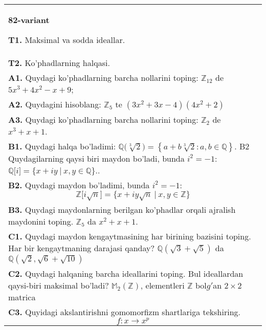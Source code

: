 \documentclass{article}
\begin{document}
\begin{tabular}{m{17cm}}
\textbf{82-variant}
\newline

\textbf{T1.} Maksimal va sodda ideallar. \\
\textbf{T2.} Ko'phadlarning halqasi. \\
\textbf{A1.} Quydagi ko'phadlarning barcha nollarini toping:
\(\mathbb{Z}_{12}\) de \(5x^{3} + 4x^{2} - x + 9\); \\
\textbf{A2.} Quydagini hisoblang:
\(\mathbb{Z}_{5}\) te \(\left( 3x^{2} + 3x - 4 \right)\left( 4x^{2} + 2 \right)\) \\
\textbf{A3.} Quydagi ko'phadlarning barcha nollarini toping:
\(\mathbb{Z}_{2}\) de \(x^{3} + x + 1\). \\
\textbf{B1.} Quydagi halqa bo'ladimi:
\(\mathbb{Q(}\sqrt[3]{2}) = \left\{ a + b\sqrt[3]{2}:a,b \in \mathbb{Q} \right\}\).
B2 Quydagilarning qaysi biri maydon bo'ladi, bunda \(i^{2} = - 1\):
\(\mathbb{Q\lbrack}i\rbrack = \{ x + iy\ |\ x,y \in \mathbb{Q\}}\).. \\
\textbf{B2.} Quydagi maydon bo'ladimi, bunda \(i^{2} = - 1\):
\[\mathbb{Z\lbrack}i\sqrt{n}\rbrack = \{ x + iy\sqrt{n}\ |\ x,y \in \mathbb{Z\}}\] \\
\textbf{B3.} Quydagi maydonlarning berilgan ko'phadlar orqali ajralish maydonini toping.
\(\mathbb{Z}_{5}\) da \(x^{2} + x + 1\). \\
\textbf{C1.} Quydagi maydon kengaytmasining har birining bazisini toping. Har bir kengaytmaning darajasi qanday?
\(\mathbb{Q}\left( \sqrt{3} + \sqrt{5} \right)\) da \(\mathbb{Q}\left( \sqrt{2},\sqrt{6} + \sqrt{10} \right)\) \\
\textbf{C2.} Quydagi halqaning barcha ideallarini toping. Bul ideallardan qaysi-biri maksimal bo'ladi?
\(\mathbb{M}_{2}\left( \mathbb{Z} \right)\), elementleri \(\mathbb{Z}\) bol\(g'\)an \(2 \times 2\) matrica \\
\textbf{C3.} Quyidagi akslantirishni gomomorfizm shartlariga tekshiring.
\[f:x \rightarrow x^{p}\] \\

\end{tabular}
\vspace{1cm}
\end{document}
